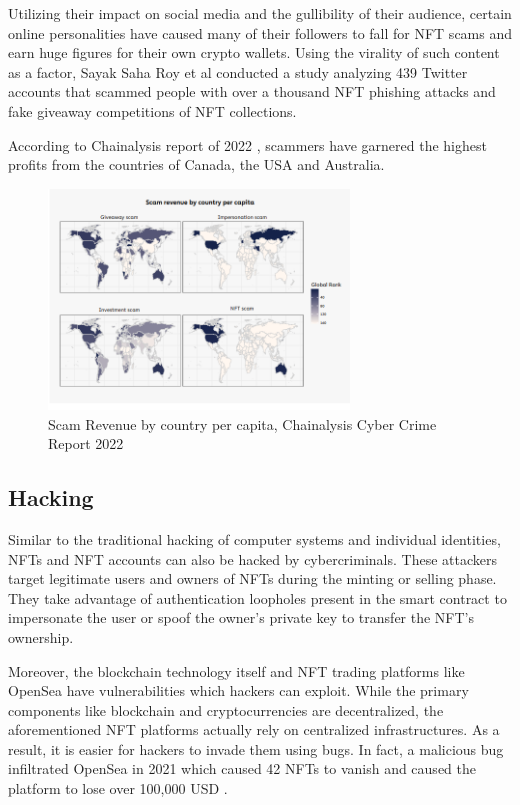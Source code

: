 \documentclass[12pt]{article}
\begin{document}
{\color{blue} Utilizing their impact on social media and the gullibility of their audience, certain online personalities have caused many of their followers to fall for NFT scams and earn huge figures for their own crypto wallets. Using the virality of such content as a factor, Sayak Saha Roy et al \cite{roy2023demystifying} conducted a study analyzing 439 Twitter accounts that scammed people with over a thousand NFT phishing attacks and fake giveaway competitions of NFT collections. 

According to Chainalysis report of 2022 \cite{Chainalysis}, scammers have garnered the highest profits from the countries of Canada, the USA and Australia.}

\begin{figure}
    \centering
    \includegraphics[width=8cm]{scam_2022.png}
    \caption{Scam Revenue by country per capita, Chainalysis Cyber Crime Report 2022}
    \label{fig:my_label}
\end{figure}

\subsection{Hacking}
{\color{blue} Similar to the traditional hacking of computer systems and individual identities, NFTs and NFT accounts can also be hacked by cybercriminals. These attackers target legitimate users and owners of NFTs during the minting or selling phase. \cite{wang2021non} They take advantage of authentication loopholes present in the smart contract to impersonate the user or spoof the owner’s private key to transfer the NFT’s ownership.}

Moreover, the blockchain technology itself and NFT trading platforms like OpenSea have vulnerabilities which hackers can exploit. While the primary components like blockchain and cryptocurrencies are decentralized, the aforementioned NFT platforms actually rely on centralized infrastructures. As a result, it is easier for hackers to invade them using bugs. In fact, a malicious bug infiltrated OpenSea in 2021 which caused 42 NFTs to vanish and caused the platform to lose over 100,000 USD \cite{9755212}. 
\end{document}
